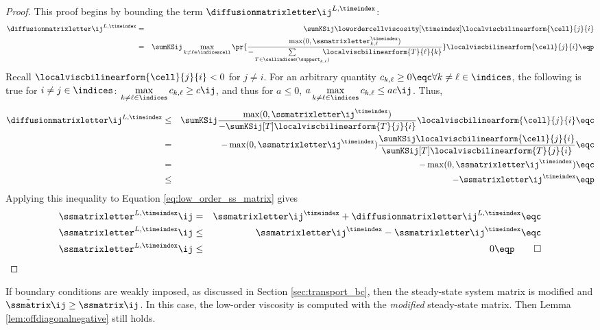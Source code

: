 \begin{proof}
This proof begins by bounding the term $\diffusionmatrixletter\ij^{L,\timeindex}$:
\begin{eqnarray*}
   \diffusionmatrixletter\ij^{L,\timeindex}
   & = &
     \sumKSij\lowordercellviscosity[\timeindex]
   \localviscbilinearform{\cell}{j}{i}\\
   & = & \sumKSij\max\limits_{k\ne \ell\in \indicescell}
     \pr{\frac{\max(0,\ssmatrixletter_{k,\ell}^\timeindex)}
       {-\sum\limits_{T\in\cellindices(\support_{k,\ell})}
       \mkern-20mu\localviscbilinearform{T}{\ell}{k}}}
     \localviscbilinearform{\cell}{j}{i} \eqp
\end{eqnarray*}
Recall $\localviscbilinearform{\cell}{j}{i} < 0$ for $j\ne i$.
For an arbitrary quantity $c_{k,\ell} \geq 0 \eqc \forall k\ne\ell\in\indices$,
the following is true for $i\ne j\in\indices$:
$\max\limits_{k\ne\ell\in\indices}c_{k,\ell} \geq c\ij$, and thus for $a\leq 0$,
$a\max\limits_{k\ne\ell\in\indices}c_{k,\ell} \leq a c\ij$.
Thus,
\begin{eqnarray*}
   \diffusionmatrixletter\ij^{L,\timeindex} & \le &
     \sumKSij \frac{\max(0,\ssmatrixletter\ij^\timeindex)}
   {-\sumKSij[T]\localviscbilinearform{T}{j}{i}}
   \localviscbilinearform{\cell}{j}{i} \eqc\\
   &  =  & -\max(0,\ssmatrixletter\ij^\timeindex)
     \frac{\sumKSij\localviscbilinearform{\cell}{j}{i}}
     {\sumKSij[T]\localviscbilinearform{T}{j}{i}} \eqc\\
   &  =  & -\max(0,\ssmatrixletter\ij^\timeindex) \eqc\\
   & \le & -\ssmatrixletter\ij^\timeindex \eqp
\end{eqnarray*}
Applying this inequality to Equation \eqref{eq:low_order_ss_matrix} gives
\begin{eqnarray*}
  \ssmatrixletter^{L,\timeindex}\ij &  =  &
    \ssmatrixletter\ij^\timeindex + \diffusionmatrixletter\ij^{L,\timeindex}
    \eqc\\
  \ssmatrixletter^{L,\timeindex}\ij & \le &
    \ssmatrixletter\ij^\timeindex - \ssmatrixletter\ij^\timeindex
    \eqc\\
  \ssmatrixletter^{L,\timeindex}\ij & \le & 0 \eqp \qed
\end{eqnarray*}
\end{proof}
\begin{remark}
If boundary conditions are weakly imposed, as discussed in Section
\ref{sec:transport_bc}, then the steady-state system matrix is modified
and $\tilde{\ssmatrix}\ij \geq \ssmatrix\ij$. In this case, the low-order
viscosity is computed with the \emph{modified} steady-state matrix. Then
Lemma \ref{lem:offdiagonalnegative} still holds.
\end{remark}
